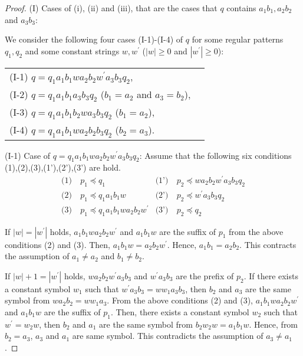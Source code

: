 \begin{proof}
\smallskip
\noindent
(I) Cases of (i), (ii) and (iii), that are the cases that $q$ contains $a_{1}b_{1}, a_{2}b_{2}$ and $a_{3}b_{3}$:


\noindent
We consider the following four cases (I-1)-(I-4) of $q$ for some regular patterns $q_{1},q_{2}$ and some constant strings $w,w^{\prime}$ ($|w|\geq 0$ and $|w^{\prime}|\geq 0$):

\smallskip
\noindent
\begin{tabular}{ll}
(I-1) $q=q_{1}a_{1}b_{1}wa_{2}b_{2}w^{\prime}a_{3}b_{3}q_{2}$,\\
(I-2) $q=q_{1}a_{1}b_{1}a_{3}b_{3}q_{2}$ ($b_{1}=a_{2}$ and $a_{3}=b_{2}$),\\
(I-3) $q=q_{1}a_{1}b_{1}b_{2}wa_{3}b_{3}q_{2}$ ($b_{1}=a_{2}$),\\
(I-4) $q=q_{1}a_{1}b_{1}wa_{2}b_{2}b_{3}q_{2}$ ($b_{2}=a_{3}$).
\end{tabular}
\smallskip

\noindent
(I-1) Case of $q=q_{1}a_{1}b_{1}wa_{2}b_{2}w^{\prime}a_{3}b_{3}q_{2}$:
Assume that the following six conditions (1),(2),(3),(1'),(2'),(3') are hold.
\begin{align*}
\textrm{(1)}~& p_{1} \preceq q_{1} & \textrm{(1')}~& p_{2} \preceq wa_{2}b_{2}w^{\prime}a_{3}b_{3}q_{2} \\
\textrm{(2)}~& p_{1} \preceq q_{1}a_{1}b_{1}w & \textrm{(2')}~& p_{2} \preceq w^{\prime}a_{3}b_{3}q_{2} \\
\textrm{(3)}~& p_{1} \preceq q_{1}a_{1}b_{1}wa_{2}b_{2}w^{\prime} & \textrm{(3')}~& p_{2} \preceq q_{2}
\end{align*}

If $|w|=|w^{\prime}|$ holds, $a_{1}b_{1}wa_{2}b_{2}w^{\prime}$ and $a_{1}b_{1}w$ are the suffix of $p_{1}$ from the above conditions (2) and (3).
Then, $a_{1}b_{1}w=a_{2}b_{2}w^{\prime}$.
Hence, $a_{1}b_{1}=a_{2}b_{2}$.
This contracts the assumption of $a_{1} \ne a_{2}$ and $b_{1} \ne b_{2}$.

If $|w|+1=|w^{\prime}|$ holds, $wa_{2}b_{2}w^{\prime}a_{3}b_{3}$ and $w^{\prime}a_{3}b_{3}$ are the prefix of $p_{2}$.
If there exists a constant symbol $w_{1}$ such that $w^{\prime}a_{3}b_{3}=ww_{1}a_{3}b_{3}$,
then $b_{2}$ and $a_{3}$ are the same symbol from $wa_{2}b_{2}=ww_{1}a_{3}$.
From the above conditions (2) and (3), $a_{1}b_{1}wa_{2}b_{2}w^{\prime}$ and $a_{1}b_{1}w$ are the suffix of $p_{1}$.
Then, there exists a constant symbol $w_{2}$ such that $w^{\prime}=w_{2}w$,
then $b_{2}$ and $a_{1}$ are the same symbol from $b_{2}w_{2}w=a_{1}b_{1}w$.
Hence, from $b_{2}=a_{3}$, $a_{3}$ and $a_{1}$ are same symbol.
This contradicts the assumption of $a_{3} \ne a_{1}$.


\end{proof}
